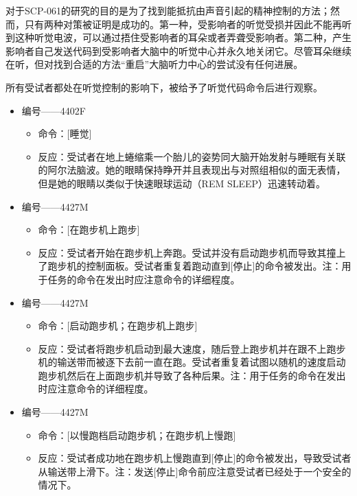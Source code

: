 对于SCP-061的研究的目的是为了找到能抵抗由声音引起的精神控制的方法；然而，只有两种对策被证明是成功的。第一种，受影响者的听觉受损并因此不能再听到这种听觉电波，可以通过捂住受影响者的耳朵或者弄聋受影响者。第二种，产生影响者自己发送代码到受影响者大脑中的听觉中心并永久地关闭它。尽管耳朵继续在听，但对找到合适的方法“重启”大脑听力中心的尝试没有任何进展。

所有受试者都处在听觉控制的影响下，被给予了听觉代码命令后进行观察。

\begin{itemize}
\item 编号——4402F\\
\begin{itemize}
\item 命令：{[}睡觉]
\item 反应：受试者在地上蜷缩乘一个胎儿的姿势同大脑开始发射与睡眠有关联的阿尔法脑波。她的眼睛保持睁开并且表现出与对照组相似的面无表情，但是她的眼睛以类似于快速眼球运动（REM SLEEP）迅速转动着。
\end{itemize}

\item 编号——4427M\\
\begin{itemize}
\item 命令：{[}在跑步机上跑步]
\item 反应：受试者开始在跑步机上奔跑。受试并没有启动跑步机而导致其撞上了跑步机的控制面板。受试者重复着跑动直到{[}停止]的命令被发出。注：用于任务的命令在发出时应注意命令的详细程度。
\end{itemize}

\item 编号——4427M\\
\begin{itemize}
\item 命令：{[}启动跑步机；在跑步机上跑步]
\item 反应：受试者将跑步机启动到最大速度，随后登上跑步机并在跟不上跑步机的输送带而被逐下去前一直在跑。受试者重复着试图以随机的速度启动跑步机然后在上面跑步机并导致了各种后果。注：用于任务的命令在发出时应注意命令的详细程度。
\end{itemize}

\item 编号——4427M\\
\begin{itemize}
\item 命令：{[}以慢跑档启动跑步机；在跑步机上慢跑]
\item 反应：受试者成功地在跑步机上慢跑直到{[}停止]的命令被发出，导致受试者从输送带上滑下。注：发送{[}停止]命令前应注意受试者已经处于一个安全的情况下。
\end{itemize}

\end{itemize}
